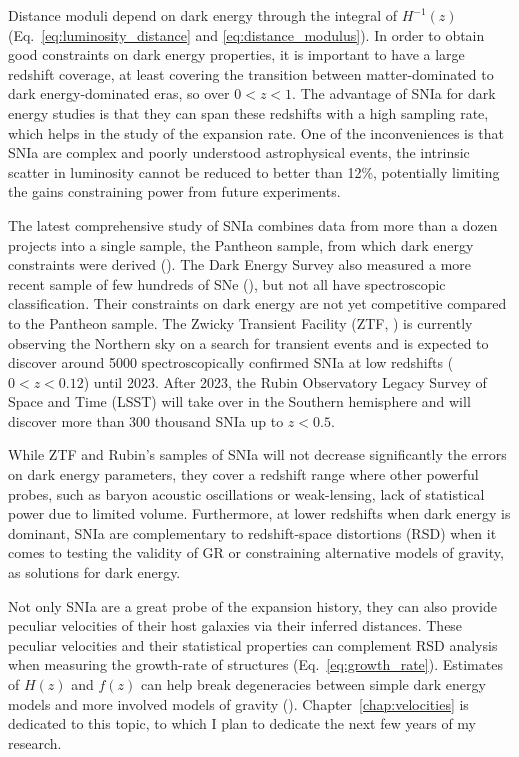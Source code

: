     Distance moduli depend on dark energy through the integral of $H^{-1}(z)$ 
    (Eq.~\ref{eq:luminosity_distance} and \ref{eq:distance_modulus}). 
    In order to obtain good constraints on dark energy properties, it is 
    important to have a large redshift coverage, at least covering the 
    transition between matter-dominated to dark energy-dominated eras, so over 
    $0< z< 1$. The advantage of SNIa for dark energy studies is that they 
    can span these redshifts with a high sampling rate, which helps in 
    the study of the expansion rate. One of the inconveniences is that SNIa 
    are complex and poorly understood astrophysical events, the intrinsic 
    scatter in luminosity cannot be reduced to better than 12\%, potentially 
    limiting the gains constraining power from future experiments. 
     
    The latest comprehensive study of SNIa combines data from more than a dozen 
    projects into a single sample, the Pantheon sample, from which dark energy 
    constraints were derived (\cite{scolnicCompleteLightcurveSample2018}).
    The Dark Energy Survey also measured a more recent sample of few hundreds of SNe
    (\cite{broutFirstCosmologyResults2019a, broutFirstCosmologyResults2019, 
    kesslerFirstCosmologyResults2019}), 
    but not all  have spectroscopic classification. 
    Their constraints on dark energy are not yet competitive compared to the Pantheon sample. 
    The Zwicky Transient Facility (ZTF, \cite{grahamZwickyTransientFacility2019}) 
    is currently observing the Northern sky 
    on a search for transient events and is expected to discover around 5000 
    spectroscopically confirmed SNIa at low redshifts ($0< z< 0.12$) until 2023. 
    After 2023, the Rubin Observatory Legacy Survey of Space and Time (LSST) 
    will take over in the Southern hemisphere
    and will discover more than 300 thousand SNIa up to $z< 0.5$. 
    
    While ZTF and Rubin's samples of SNIa will not decrease significantly the 
    errors on dark energy parameters, they cover a redshift range where other 
    powerful probes, such as baryon acoustic oscillations or weak-lensing, 
    lack of statistical power due to limited volume. 
    Furthermore, at lower redshifts when dark energy is dominant, SNIa are 
    complementary to redshift-space distortions (RSD) when it comes to testing 
    the validity of GR or constraining alternative models of gravity,
    as solutions for dark energy. 

    Not only SNIa are a great probe of the 
    expansion history, they can also provide peculiar velocities of their 
    host galaxies via their inferred distances. 
    These peculiar velocities and their statistical properties can complement 
    RSD analysis when measuring the growth-rate of structures 
    (Eq.~\ref{eq:growth_rate}). Estimates of $H(z)$ and $f(z)$ can help 
    break degeneracies between simple dark energy models and more involved 
    models of gravity (\cite{kimComplementarityPeculiarVelocity2020, 
    grazianiPeculiarVelocityCosmology2020}). 
    Chapter~\ref{chap:velocities} is dedicated to this 
    topic, to which I plan to dedicate the next few years of my research.  


